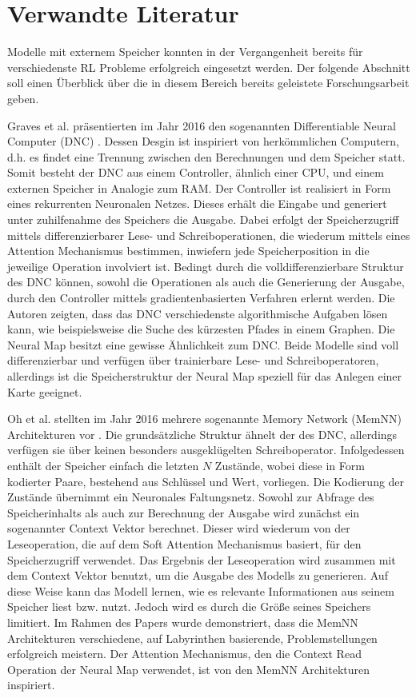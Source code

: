 \chapter{Verwandte Literatur}

Modelle mit externem Speicher konnten in der Vergangenheit bereits für verschiedenste RL Probleme erfolgreich eingesetzt werden. Der folgende Abschnitt soll einen Überblick über die in diesem Bereich bereits geleistete Forschungsarbeit geben.

Graves et al. präsentierten im Jahr 2016 den sogenannten Differentiable Neural Computer (DNC) \cite{DNC}. Dessen Desgin ist inspiriert von herkömmlichen Computern, d.h. es findet eine Trennung zwischen den Berechnungen und dem Speicher statt. Somit besteht der DNC aus einem Controller, ähnlich einer CPU, und einem externen Speicher in Analogie zum RAM. Der Controller ist realisiert in Form eines rekurrenten Neuronalen Netzes. Dieses erhält die Eingabe und generiert unter zuhilfenahme des Speichers die Ausgabe. Dabei erfolgt der Speicherzugriff mittels differenzierbarer Lese- und Schreiboperationen, die wiederum mittels eines Attention Mechanismus bestimmen, inwiefern jede Speicherposition in die jeweilige Operation involviert ist. Bedingt durch die volldifferenzierbare Struktur des DNC können, sowohl die Operationen als auch die Generierung der Ausgabe, durch den Controller mittels gradientenbasierten Verfahren erlernt werden. Die Autoren zeigten, dass das DNC verschiedenste algorithmische Aufgaben lösen kann, wie beispielsweise die Suche des kürzesten Pfades in einem Graphen. Die Neural Map besitzt eine gewisse Ähnlichkeit zum DNC. Beide Modelle sind voll differenzierbar und verfügen über trainierbare Lese- und Schreiboperatoren, allerdings ist die Speicherstruktur der Neural Map speziell für das Anlegen einer Karte geeignet.

Oh et al. stellten im Jahr 2016 mehrere sogenannte Memory Network (MemNN) Architekturen vor \cite{MemNN}. Die grundsätzliche Struktur ähnelt der des DNC, allerdings verfügen sie über keinen besonders ausgeklügelten Schreiboperator. Infolgedessen enthält der Speicher einfach die letzten $N$ Zustände, wobei diese in Form kodierter Paare, bestehend aus Schlüssel und Wert, vorliegen. Die Kodierung der Zustände übernimmt ein Neuronales Faltungsnetz. Sowohl zur Abfrage des Speicherinhalts als auch zur Berechnung der Ausgabe wird zunächst ein sogenannter Context Vektor berechnet. Dieser wird wiederum von der Leseoperation, die auf dem Soft Attention Mechanismus basiert, für den Speicherzugriff verwendet. Das Ergebnis der Leseoperation wird zusammen mit dem Context Vektor benutzt, um die Ausgabe des Modells zu generieren. Auf diese Weise kann das Modell lernen, wie es relevante Informationen aus seinem Speicher liest bzw. nutzt. Jedoch wird es durch die Größe seines Speichers limitiert. Im Rahmen des Papers wurde demonstriert, dass die MemNN Architekturen verschiedene, auf Labyrinthen basierende, Problemstellungen erfolgreich meistern. Der Attention Mechanismus, den die Context Read Operation der Neural Map verwendet, ist von den MemNN Architekturen inspiriert.

